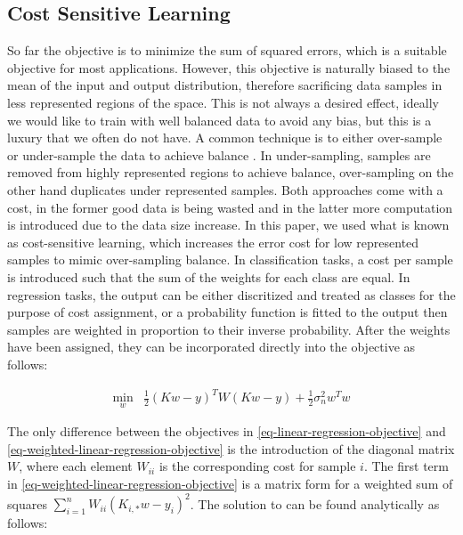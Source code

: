 \documentclass[useAMS,usenatbib,fleqn]{mn2e}
\begin{document}
\subsection{Cost Sensitive Learning}

So far the objective is to minimize the sum of squared errors, which is a suitable objective for most applications. However, this objective is naturally biased to the mean of the input and output distribution, therefore sacrificing data samples in less represented regions of the space. This is not always a desired effect, ideally we would like to train with well balanced data to avoid any bias, but this is a luxury that we often do not have. A common technique is to either over-sample or under-sample the data to achieve balance \cite{}. In under-sampling, samples are removed from highly represented regions to achieve balance, over-sampling on the other hand duplicates under represented samples. Both approaches come with a cost, in the former good data is being wasted and in the latter more computation is introduced due to the data size increase. In this paper, we used what is known as cost-sensitive learning, which increases the error cost for low represented samples to mimic over-sampling balance. In classification tasks, a cost per sample is introduced such that the sum of the weights for each class are equal. In regression tasks, the output can be either discritized and treated as classes for the purpose of cost assignment, or a probability function is fitted to the output then samples are weighted in proportion to their inverse probability. After the weights have been assigned, they can be incorporated directly into the objective as follows:

\begin{equation}
\label{eq-weighted-linear-regression-objective}
\begin{array}{lcl}
\underset{w}{\text{min}} &\frac{1}{2}\left ( Kw-y \right )^{T} W\left( Kw-y \right )+\frac{1}{2}\sigma_{n}^{2}w^{T}w
\end{array}
\end{equation}

The only difference between the objectives in \eqref{eq-linear-regression-objective} and \eqref{eq-weighted-linear-regression-objective} is the introduction of the diagonal matrix $W$, where each element $W_{ii}$ is the corresponding cost for sample $i$. The first term in \eqref{eq-weighted-linear-regression-objective} is a matrix form for a weighted sum of squares $\sum_{i=1}^{n}W_{ii}\left(K_{i,*}w-y_{i}\right)^{2}$. The solution to can be found analytically as follows:
\end{document}
